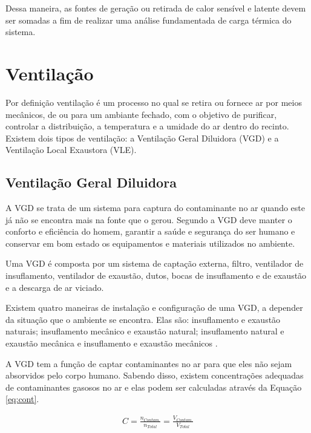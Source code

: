 \documentclass[acronym,symbols,table]{fei}
\begin{document}
Dessa maneira, as fontes de geração ou retirada de calor sensível e latente devem ser somadas a fim de realizar uma análise fundamentada de carga térmica do sistema. 

\section{Ventilação} \label{ventilação}

Por definição ventilação é um processo no qual se retira ou fornece ar por meios mecânicos, de ou para um ambiante fechado, com o objetivo de purificar, controlar a distribuição, a temperatura e a umidade do ar dentro do recinto. Existem dois tipos de ventilação: a Ventilação Geral Diluidora (VGD) e a Ventilação Local Exaustora (VLE). 

\subsection{Ventilação Geral Diluidora} \label{VGD}

A VGD se trata de um sistema para captura do contaminante no ar quando este já não se encontra mais na fonte que o gerou. Segundo \textcite{ventilacaoindustrial} a VGD deve manter o conforto e eficiência do homem, garantir a saúde e segurança do ser humano e conservar em bom estado os equipamentos e materiais utilizados no ambiente.

Uma VGD é composta por um sistema de captação externa, filtro, ventilador de insuflamento, ventilador de exaustão, dutos, bocas de insuflamento e de exaustão e a descarga de ar viciado.

Existem quatro maneiras de instalação e configuração de uma VGD, a depender da situação que o ambiente se encontra. Elas são: insuflamento e exaustão naturais; insuflamento mecânico e exaustão natural; insuflamento natural e exaustão mecânica e insuflamento e exaustão mecânicos \cite{ventilacaoindustrial}.

A VGD tem a função de captar contaminantes no ar para que eles não sejam absorvidos pelo corpo humano. Sabendo disso, existem concentrações adequadas de contaminantes gasosos no ar e elas podem ser calculadas através da Equação \ref{eq:cont}.

\begin{equation} \label{eq:cont}
    \begin{aligned}
C=\frac{n_{Contam.}}{n_{Total}}=\frac{V_{Contam.}}{V_{Total}}
    \end{aligned}
\end{equation}
\end{document}
